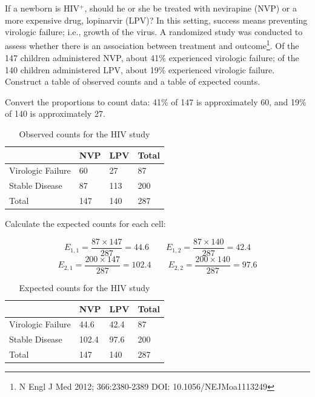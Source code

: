 \begin{example} {If a newborn is HIV$^+$, should he or she be treated with nevirapine (NVP) or a more expensive drug, lopinarvir (LPV)? In this setting, success means preventing virologic failure; i.e., growth of the virus. A randomized study was conducted to assess whether there is an association between treatment and outcome\footnote{N Engl J Med 2012; 366:2380-2389
DOI: 10.1056/NEJMoa1113249}. Of the 147 children administered NVP, about 41\% experienced virologic failure; of the 140 children administered LPV, about 19\% experienced virologic failure. Construct a table of observed counts and a table of expected counts.}
	
Convert the proportions to count data: 41\% of 147 is approximately 60, and 19\% of 140 is approximately 27. 

\begin{table}[h]
	\centering
	\begin{tabular}{l | l l | l}
	\hline
	& NVP & LPV & Total \\
	\hline
	Virologic Failure & 60 & 27 & 87 \\
	Stable Disease & 87 & 113 & 200 \\	
	\hline
	Total & 147 & 140 & 287 \\
	\hline
	\end{tabular}
	\caption{Observed counts for the HIV study}
\end{table}

Calculate the expected counts for each cell:

\[E_{1, 1} = \dfrac{87 \times 147}{287} = 44.6 \qquad E_{1, 2} = \dfrac{87 \times 140}{287} = 42.4 \]
\[E_{2, 1} = \dfrac{200 \times 147}{287} = 102.4 \qquad E_{2, 2} = \dfrac{200 \times 140}{287} = 97.6 \]

\begin{table}[h]
	\centering
	\begin{tabular}{l | l l | l}
		\hline
		& NVP & LPV & Total \\
		\hline
		Virologic Failure & 44.6 & 42.4 & 87 \\
		Stable Disease & 102.4 & 97.6 & 200 \\
		\hline	
		Total & 147 & 140 & 287 \\
		\hline
	\end{tabular}
	\caption{Expected counts for the HIV study}
\end{table}

\end{example}

